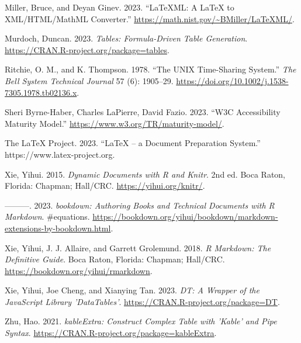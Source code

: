 \begin{CSLReferences}{1}{0}
\leavevmode{}%
Miller, Bruce, and Deyan Ginev. 2023. {``{LaTeXML}: A {LaTeX} to {XML/HTML/MathML} Converter.''} \url{https://math.nist.gov/~BMiller/LaTeXML/}.

\leavevmode{}%
Murdoch, Duncan. 2023. \emph{Tables: Formula-Driven Table Generation}. \url{https://CRAN.R-project.org/package=tables}.

\leavevmode{}%
Ritchie, O. M., and K. Thompson. 1978. {``The UNIX Time-Sharing System.''} \emph{The Bell System Technical Journal} 57 (6): 1905--29. \url{https://doi.org/10.1002/j.1538-7305.1978.tb02136.x}.

\leavevmode{}%
Sheri Byrne-Haber, Charles LaPierre, David Fazio. 2023. {``W3C Accessibility Maturity Model.''} \url{https://www.w3.org/TR/maturity-model/}.

\leavevmode{}%
The LaTeX Project. 2023. {``LaTeX -- a Document Preparation System.''} https://www.latex-project.org.

\leavevmode{}%
Xie, Yihui. 2015. \emph{Dynamic Documents with {R} and Knitr}. 2nd ed. Boca Raton, Florida: Chapman; Hall/CRC. \url{https://yihui.org/knitr/}.

\leavevmode{}%
---------. 2023. \emph{{bookdown: Authoring Books and Technical Documents with R Markdown}}. \#equations. \url{https://bookdown.org/yihui/bookdown/markdown-extensions-by-bookdown.html}.

\leavevmode{}%
Xie, Yihui, J. J. Allaire, and Garrett Grolemund. 2018. \emph{R Markdown: The Definitive Guide}. Boca Raton, Florida: Chapman; Hall/CRC. \url{https://bookdown.org/yihui/rmarkdown}.

\leavevmode{}%
Xie, Yihui, Joe Cheng, and Xianying Tan. 2023. \emph{DT: A Wrapper of the JavaScript Library 'DataTables'}. \url{https://CRAN.R-project.org/package=DT}.

\leavevmode{}%
Zhu, Hao. 2021. \emph{kableExtra: Construct Complex Table with 'Kable' and Pipe Syntax}. \url{https://CRAN.R-project.org/package=kableExtra}.

\end{CSLReferences}



